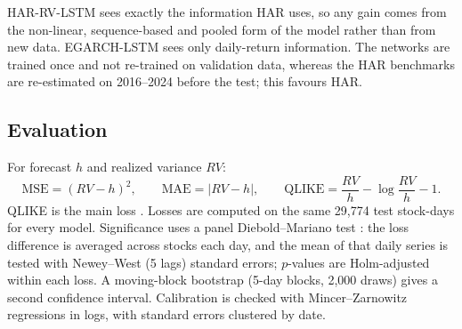 HAR-RV-LSTM sees exactly the information HAR uses, so any gain comes from the non-linear,
sequence-based and pooled form of the model rather than from new data. EGARCH-LSTM sees only
daily-return information. The networks are trained once and not re-trained on validation data,
whereas the HAR benchmarks are re-estimated on 2016--2024 before the test; this favours HAR.

\subsection{Evaluation}

For forecast $h$ and realized variance $RV$:
\begin{equation}
\text{MSE}=(RV-h)^2,\qquad \text{MAE}=|RV-h|,\qquad \text{QLIKE}=\frac{RV}{h}-\log\frac{RV}{h}-1 .
\end{equation}
QLIKE is the main loss \citep{patton2011}. Losses are computed on the same 29,774 test stock-days for
every model. Significance uses a panel Diebold--Mariano test \citep{diebold1995}: the loss
difference is averaged across stocks each day, and the mean of that daily series is tested with
Newey--West (5 lags) standard errors; $p$-values are Holm-adjusted within each loss. A moving-block
bootstrap (5-day blocks, 2,000 draws) gives a second confidence interval. Calibration is checked with
Mincer--Zarnowitz regressions in logs, with standard errors clustered by date.
